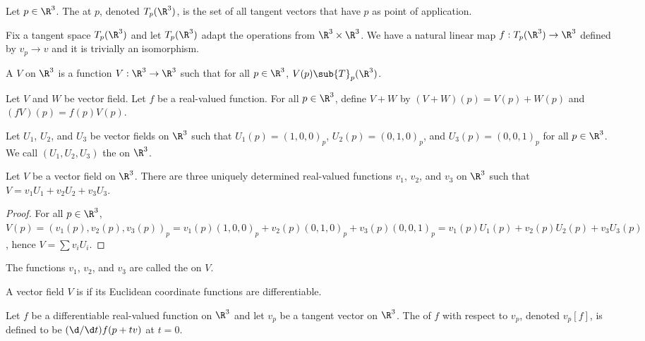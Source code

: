 \documentclass[10pt]{article}
\begin{document}
\begin{definition}
    Let $p\in{\R}^{3}$. The  at $p$, denoted ${T}_{p}({\R}^{3})$, is the set of all tangent vectors that have $p$ as point of application.
\end{definition}
\par
Fix a tangent space ${T}_{p}({\R}^{3})$ and let ${T}_{p}({\R}^{3})$ adapt the operations from ${\R}^{3}\times{\R}^{3}$. We have a natural linear map $f:{T}_{p}({\R}^{3})\to{\R}^{3}$ defined by ${v}_{p}\to v$ and it is trivially an isomorphism.
\begin{definition}
    A  $V$ on ${\R}^{3}$ is a function $V:{\R}^{3}\to{\R}^{3}$ such that for all $p\in{\R}^{3}$, $V(p)\sub{T}_{p}({\R}^{3})$.
\end{definition}
\par
Let $V$ and $W$ be vector field. Let $f$ be a real-valued function. For all $p\in{\R}^{3}$, define $V+W$ by $(V+W)(p)=V(p)+W(p)$ and $(fV)(p)=f(p)V(p)$.
\begin{definition}
    Let ${U}_{1}$, ${U}_{2}$, and ${U}_{3}$ be vector fields on ${\R}^{3}$ such that ${U}_{1}(p)={(1,0,0)}_{p}$, ${U}_{2}(p)={(0,1,0)}_{p}$, and ${U}_{3}(p)={(0,0,1)}_{p}$ for all $p\in{\R}^{3}$. We call $({U}_{1},{U}_{2},{U}_{3})$ the  on ${\R}^{3}$.
\end{definition}
\begin{proposition}
    Let $V$ be a vector field on ${\R}^{3}$. There are three uniquely determined real-valued functions ${v}_{1}$, ${v}_{2}$, and ${v}_{3}$ on ${\R}^{3}$ such that $V={v}_{1}{U}_{1}+{v}_{2}{U}_{2}+{v}_{3}{U}_{3}$.
\end{proposition}
\begin{proof}
    For all $p\in{\R}^{3}$, $V(p)={({v}_{1}(p),{v}_{2}(p),{v}_{3}(p))}_{p}={v}_{1}(p){(1,0,0)}_{p}+{v}_{2}(p){(0,1,0)}_{p}+{v}_{3}(p){(0,0,1)}_{p}={v}_{1}(p){U}_{1}(p)+{v}_{2}(p){U}_{2}(p)+{v}_{3}{U}_{3}(p)$, hence $V=\sum{v}_{i}{U}_{i}$.
\end{proof}
\par
The functions ${v}_{1}$, ${v}_{2}$, and ${v}_{3}$ are called the  on $V$.
\begin{definition}
    A vector field $V$ is  if its Euclidean coordinate functions are differentiable.
\end{definition}
\begin{definition}
    Let $f$ be a differentiable real-valued function on ${\R}^{3}$ and let ${v}_{p}$ be a tangent vector on ${\R}^{3}$. The  of $f$ with respect to ${v}_{p}$, denoted ${v}_{p}[f]$, is defined to be $(\d/\d t)f(p+tv)$ at $t=0$.
\end{definition}
\end{document}
